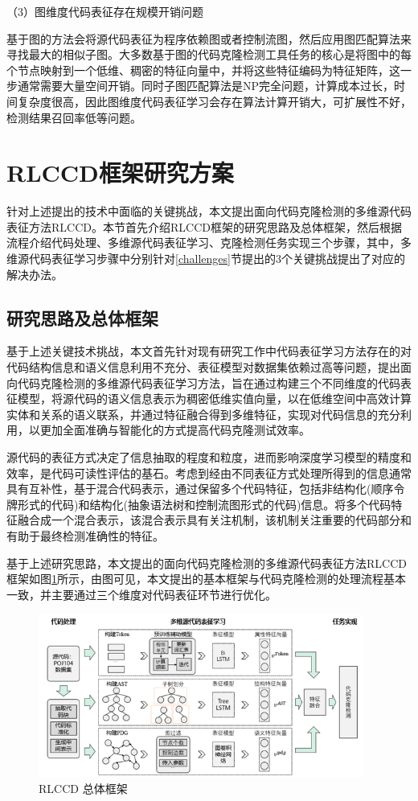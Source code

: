 （3）图维度代码表征存在规模开销问题

基于图的方法会将源代码表征为程序依赖图或者控制流图，然后应用图匹配算法来寻找最大的相似子图。大多数基于图的代码克隆检测工具任务的核心是将图中的每个节点映射到一个低维、稠密的特征向量中，并将这些特征编码为特征矩阵，这一步通常需要大量空间开销。同时子图匹配算法是NP完全问题，计算成本过长，时间复杂度很高，因此图维度代码表征学习会存在算法计算开销大，可扩展性不好，检测结果召回率低等问题。

\section{RLCCD框架研究方案}
\label{sec:Framework}
针对上述提出的技术中面临的关键挑战，本文提出面向代码克隆检测的多维源代码表征方法RLCCD。本节首先介绍RLCCD框架的研究思路及总体框架，然后根据流程介绍代码处理、多维源代码表征学习、克隆检测任务实现三个步骤，其中，多维源代码表征学习步骤中分别针对\ref{challenges}节提出的3个关键挑战提出了对应的解决办法。

\subsection{研究思路及总体框架}
\label{subsec:Ideas}
基于上述关键技术挑战，本文首先针对现有研究工作中代码表征学习方法存在的对代码结构信息和语义信息利用不充分、表征模型对数据集依赖过高等问题，提出面向代码克隆检测的多维源代码表征学习方法，旨在通过构建三个不同维度的代码表征模型，将源代码的语义信息表示为稠密低维实值向量，以在低维空间中高效计算实体和关系的语义联系，并通过特征融合得到多维特征，实现对代码信息的充分利用，以更加全面准确与智能化的方式提高代码克隆测试效率。 

源代码的表征方式决定了信息抽取的程度和粒度，进而影响深度学习模型的精度和效率，是代码可读性评估的基石。考虑到经由不同表征方式处理所得到的信息通常具有互补性，基于混合代码表示，通过保留多个代码特征，包括非结构化(顺序令牌形式的代码)和结构化(抽象语法树和控制流图形式的代码)信息。将多个代码特征融合成一个混合表示，该混合表示具有关注机制，该机制关注重要的代码部分和有助于最终检测准确性的特征。

基于上述研究思路，本文提出的面向代码克隆检测的多维源代码表征方法RLCCD框架如图\ref{fig:framework}所示，由图可见，本文提出的基本框架与代码克隆检测的处理流程基本一致，并主要通过三个维度对代码表征环节进行优化。

\begin{figure}[H]
    \centering
    \includegraphics[width=0.95\textwidth]{figures/framework}
    \caption{RLCCD 总体框架}
    \label{fig:framework}
\end{figure}


